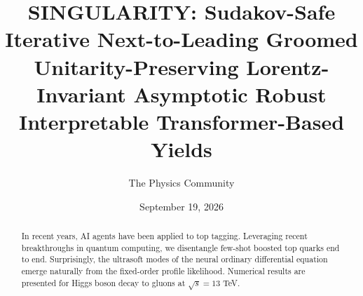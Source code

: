 \documentclass[11pt]{article}
\title{SINGULARITY: Sudakov-Safe Iterative Next-to-Leading Groomed Unitarity-Preserving Lorentz-Invariant Asymptotic Robust Interpretable Transformer-Based Yields}
\author{The Physics Community}
\date{September 19, 2026}
\begin{document}
\maketitle
\begin{abstract}
In recent years, AI agents have been applied to top tagging. Leveraging
recent breakthroughs in quantum computing, we disentangle few-shot
boosted top quarks end to end. Surprisingly, the ultrasoft modes of the
neural ordinary differential equation emerge naturally from the
fixed-order profile likelihood. Numerical results are presented for
Higgs boson decay to gluons at $\sqrt{s} = 13$ TeV.
\end{abstract}
\tableofcontents




\nocite{*}


\end{document}
